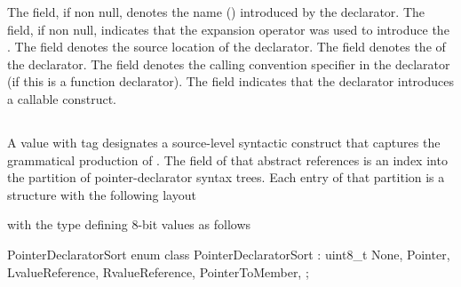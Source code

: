 The  field, if non null, denotes the name () introduced by the declarator.
The  field, if non null, indicates that the expansion operator  was used to introduce the .
The  field denotes the source location of the declarator.
The  field denotes the  of the declarator.
The  field denotes the calling convention specifier in the declarator (if this is a function declarator).
The  field indicates that the declarator introduces a callable construct.




\subsection{}
\label{sec:ifc:SyntaxSort:PointerDeclarator} 

A  value with tag  designates a source-level syntactic construct
that captures the grammatical production of .
The  field of that abstract references is an index into the partition of pointer-declarator syntax trees.
Each entry of that partition is a structure with the following layout
%
\begin{figure}[H]
	\centering
	\label{fig:ifc:SyntaxSort:PointerDeclarator}
\end{figure}
%
with the type  defining $8$-bit values as follows
\begin{typedef}{PointerDeclaratorSort}{}
	enum class PointerDeclaratorSort : uint8_t {
		None,
		Pointer,
		LvalueReference,
		RvalueReference,
		PointerToMember,
	};
\end{typedef}


